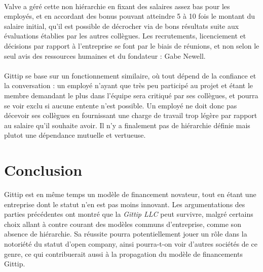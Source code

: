 \paragraph{}
Valve a géré cette non hiérarchie en fixant des salaires assez bas pour les
employés, et en accordant des bonus pouvant atteindre 5 à 10 fois le montant du
salaire initial, qu'il est possible de décrocher via de bons résultats suite
aux évaluations établies par les autres collègues. Les recrutements,
licenciement et décisions par rapport à l'entreprise se font par le biais de
réunions, et non selon le seul avis des ressources humaines et du fondateur :
Gabe Newell.

\paragraph{}
Gittip se base sur un fonctionnement similaire, où tout dépend de la
confiance et la conversation : un employé n'ayant que très peu participé au
projet et étant le membre demandant le plus dans l'équipe sera critiqué par ses
collègues, et pourra se voir exclu si aucune entente n'est possible. Un employé
ne doit donc pas décevoir ses collègues en fournissant une charge de travail
trop légère par rapport au salaire qu'il souhaite avoir. Il n'y a
finalement pas de hiérarchie définie mais plutot une dépendance mutuelle
et vertueuse.


    \section{Conclusion}

Gittip est en même temps un modèle de financement novateur, tout en étant une
entreprise dont le statut n'en est pas moins innovant. Les argumentations des
parties précédentes ont montré que la \emph{Gittip LLC} peut survivre, malgré
certains choix allant à contre courant des modèles communs d'entreprise, comme
son absence de hiérarchie. Sa réussite pourra potentiellement jouer un rôle
dans la notoriété du statut d'open company, ainsi pourra-t-on voir d'autres
sociétés de ce genre, ce qui contribuerait aussi à la propagation du modèle de
financements Gittip.
